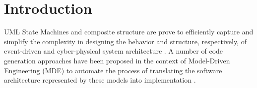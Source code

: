 \section{Introduction}
\label{sec:intro}






UML State Machines and composite structure are prove to efficiently capture and simplify the complexity in designing the behavior and structure, respectively, of event-driven and cyber-physical system architecture \cite{possepapyrusrt,Ringert2013}.
A number of code generation approaches have been proposed in the context of Model-Driven Engineering (MDE) \cite{kent2002model} to automate the process of translating the software architecture represented by these models into implementation 
\cite{possepapyrusrt, Douglass1999, ibm_rhapsody}.

